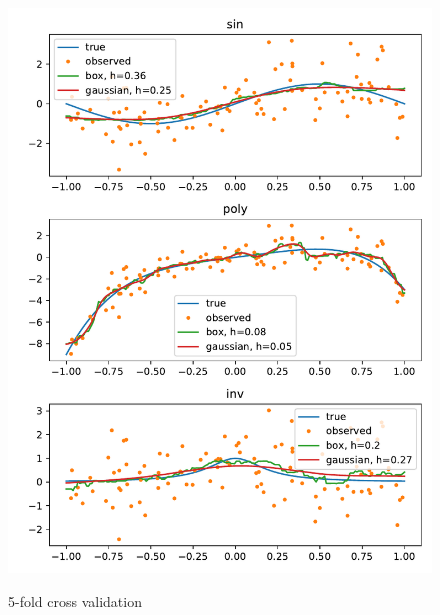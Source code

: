\documentclass[letterpaper]{article}
\begin{document}
\begin{enumerate}[(a)]
  \begin{figure}
    \caption{5-fold cross validation}
    \includegraphics{cv_kernel_regression_5.pdf}
    \label{fig:5fold}
  \end{figure}


\end{enumerate}
\end{document}
